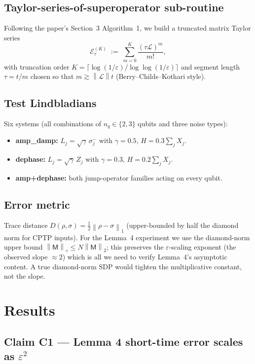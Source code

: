 \documentclass[11pt]{article}
\newcommand{\diamondnorm}[1]{\left\lVert #1 \right\rVert_{\diamond}}
\newcommand{\opnorm}[1]{\left\lVert #1 \right\rVert}
\begin{document}
\subsection{Taylor-series-of-superoperator sub-routine}
Following the paper's Section~3 Algorithm~1, we build a truncated matrix Taylor series
\begin{equation}
  \mathcal{E}_\tau^{(K)} \;:=\; \sum_{m=0}^{K} \frac{(\tau \mathcal{L})^m}{m!},
\end{equation}
with truncation order $K = \lceil \log(1/\varepsilon)/\log\log(1/\varepsilon)\rceil$ and segment length $\tau = t/m$ chosen so that $m \gtrsim \opnorm{\mathcal{L}} t$ (Berry--Childs--Kothari style).

\subsection{Test Lindbladians}
Six systems (all combinations of $n_q \in \{2,3\}$ qubits and three noise types):
\begin{itemize}
  \item \textbf{amp\_damp:} $L_j = \sqrt{\gamma}\, \sigma_j^-$ with $\gamma = 0.5$, $H = 0.3 \sum_j X_j$.
  \item \textbf{dephase:} $L_j = \sqrt{\gamma}\, Z_j$ with $\gamma = 0.3$, $H = 0.2 \sum_j X_j$.
  \item \textbf{amp+dephase:} both jump-operator families acting on every qubit.
\end{itemize}

\subsection{Error metric}
Trace distance $D(\rho, \sigma) = \tfrac12 \opnorm{\rho - \sigma}_1$ (upper-bounded by half the diamond norm for CPTP inputs).  For the Lemma~4 experiment we use the diamond-norm upper bound $\diamondnorm{\mathsf{M}} \le N \opnorm{\mathsf{M}}_2$; this preserves the $\varepsilon$-scaling exponent (the observed slope $\approx 2$) which is all we need to verify Lemma~4's asymptotic content.  A true diamond-norm SDP would tighten the multiplicative constant, not the slope.

\section{Results}

\subsection{Claim C1 --- Lemma 4 short-time error scales as $\varepsilon^2$}
\end{document}
